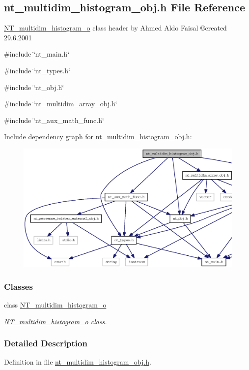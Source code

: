\subsection{nt\_\-multidim\_\-histogram\_\-obj.h File Reference}
\label{nt__multidim__histogram__obj_8h}



\begin{DoxyItemize}
\item \hyperlink{class_n_t__multidim__histogram__o}{NT\_\-multidim\_\-histogram\_\-o} class header by Ahmed Aldo Faisal \copyright created 29.6.2001 
\end{DoxyItemize} 


{\ttfamily \#include \char`\"{}nt\_\-main.h\char`\"{}}\par
{\ttfamily \#include \char`\"{}nt\_\-types.h\char`\"{}}\par
{\ttfamily \#include \char`\"{}nt\_\-obj.h\char`\"{}}\par
{\ttfamily \#include \char`\"{}nt\_\-multidim\_\-array\_\-obj.h\char`\"{}}\par
{\ttfamily \#include \char`\"{}nt\_\-aux\_\-math\_\-func.h\char`\"{}}\par
Include dependency graph for nt\_\-multidim\_\-histogram\_\-obj.h:
\nopagebreak
\begin{figure}[H]
\begin{center}
\leavevmode
\includegraphics[width=400pt]{nt__multidim__histogram__obj_8h__incl}
\end{center}
\end{figure}
\subsubsection*{Classes}
\begin{DoxyCompactItemize}
\item 
class \hyperlink{class_n_t__multidim__histogram__o}{NT\_\-multidim\_\-histogram\_\-o}
\begin{DoxyCompactList}\small\item\em \hyperlink{class_n_t__multidim__histogram__o}{NT\_\-multidim\_\-histogram\_\-o} class. \item\end{DoxyCompactList}\end{DoxyCompactItemize}


\subsubsection{Detailed Description}


Definition in file \hyperlink{nt__multidim__histogram__obj_8h_source}{nt\_\-multidim\_\-histogram\_\-obj.h}.

